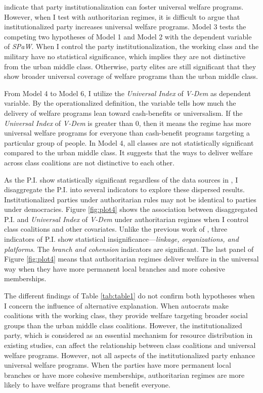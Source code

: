 \documentclass[11pt, notitlepage]{article}
\begin{document}
\citet[16]{Rasmussen2019} indicate that party institutionalization can foster universal welfare programs. However, when I test with authoritarian regimes, it is difficult to argue that institutionalized party increases universal welfare programs. Model 3 tests the competing two hypotheses of Model 1 and Model 2 with the dependent variable of \textit{SPaW}. When I control the party institutionalization, the working class and the military have no statistical significance, which implies they are not distinctive from the urban middle class. Otherwise, party elites are still significant that they show broader universal coverage of welfare programs than the urban middle class.



From Model 4 to Model 6, I utilize the \textit{Universal Index} of \textit{V-Dem} as dependent variable. By the operationalized definition, the variable tells how much the delivery of welfare programs lean toward cash-benefits or universalism. If the \textit{Universal Index} of \textit{V-Dem} is greater than 0, then it means the regime has more universal welfare programs for everyone than cash-benefit programs targeting a particular group of people. In Model 4, all classes are not statistically significant compared to the urban middle class. It suggests that the ways to deliver welfare across class coalitions are not distinctive to each other.

As the P.I. show statistically significant regardless of the data sources in \citep{Rasmussen2019}, I disaggregate the P.I. into several indicators to explore these dispersed results. Institutionalized parties under authoritarian rules may not be identical to parties under democracies. Figure \ref{fig:plot4} shows the association between disaggregated P.I. and \textit{Universal Index} of \textit{V-Dem} under authoritarian regimes when I control class coalitions and other covariates. Unlike the previous work of \citet{Rasmussen2019}, three indicators of P.I. show statistical insignificance---\textit{linkage, organizations, and platforms}. The \textit{branch and cohension} indicators are significant. The last panel of Figure \ref{fig:plot4} means that authoritarian regimes deliver welfare in the universal way when they have more permanent local branches and more cohesive memberships. 

The different findings of Table \ref{tab:table1} do not confirm both hypotheses when I concern the influence of alternative explanation. When autocrats make coalitions with the working class, they provide welfare targeting broader social groups than the urban middle class coalitions. However, the institutionalized party, which is considered as an essential mechanism for resource distribution in existing studies, can affect the relationship between class coalitions and universal welfare programs. However, not all aspects of the institutionalized party enhance universal welfare programs. When the parties have more permanent local branches or have more cohesive memberships, authoritarian regimes are more likely to have welfare programs that benefit everyone.
\end{document}
